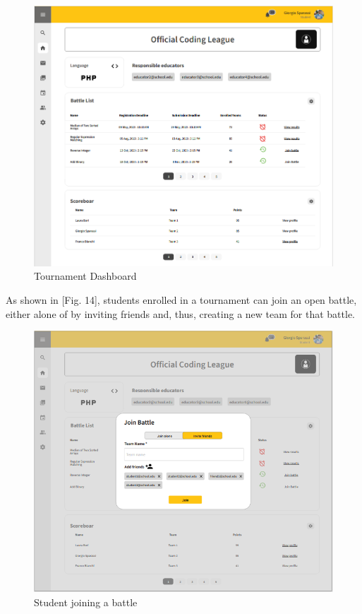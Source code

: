 \documentclass[12pt,oneside,a4paper]{article}
\begin{document}
\begin{figure}[htbp]
    \centering
    \includegraphics[width=1\linewidth]{Images/Interfaces/Student Interfaces/TournamentDashboard.PNG}
    \caption{Tournament Dashboard}
    \label{fig:enter-label}
\end{figure}

\pagebreak

\begin{flushleft}
As shown in [Fig. 14], students enrolled in a tournament can join an open battle, either alone of by inviting friends and, thus, creating a new team for that battle.  
\end{flushleft}

\begin{figure}[htbp]
    \centering
    \includegraphics[width=1\linewidth]{Images/Interfaces/Student Interfaces/JoinBattleStud.PNG}
    \caption{Student joining a battle}
    \label{fig:enter-label}
\end{figure}
\end{document}
